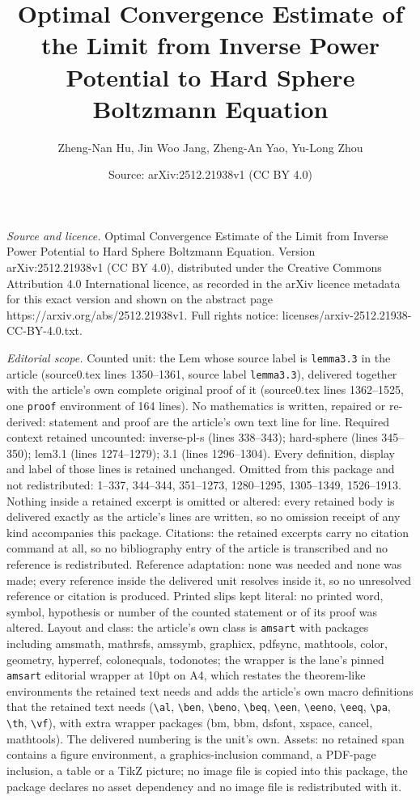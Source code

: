 \documentclass[10pt,a4paper]{amsart}
\title[Optimal Convergence Estimate of the Limit from Inverse Power]{Optimal Convergence Estimate of the Limit from Inverse Power Potential to Hard Sphere Boltzmann Equation}
\author{Zheng-Nan Hu, Jin Woo Jang, Zheng-An Yao, Yu-Long Zhou}
\date{Source: arXiv:2512.21938v1 (CC BY 4.0)}
\begin{document}
\maketitle

\noindent\emph{Source and licence.} Optimal Convergence Estimate of the Limit from Inverse Power Potential to Hard Sphere Boltzmann Equation. Version arXiv:2512.21938v1 (CC BY 4.0), distributed under the Creative Commons Attribution 4.0 International licence, as recorded in the arXiv licence metadata for this exact version and shown on the abstract page https://arxiv.org/abs/2512.21938v1. Full rights notice: licenses/arxiv-2512.21938-CC-BY-4.0.txt.\par\smallskip

\noindent\textit{Editorial scope.} Counted unit: the Lem whose source label is \texttt{lemma3.3} in the article (source0.tex lines 1350--1361, source label \texttt{lemma3.3}), delivered together with the article's own complete original proof of it (source0.tex lines 1362--1525, one \texttt{proof} environment of 164 lines). No mathematics is written, repaired or re-derived: statement and proof are the article's own text line for line. Required context retained uncounted: inverse-pl-s (lines 338--343); hard-sphere (lines 345--350); lem3.1 (lines 1274--1279); 3.1 (lines 1296--1304). Every definition, display and label of those lines is retained unchanged. Omitted from this package and not redistributed: 1--337, 344--344, 351--1273, 1280--1295, 1305--1349, 1526--1913. Nothing inside a retained excerpt is omitted or altered: every retained body is delivered exactly as the article's lines are written, so no omission receipt of any kind accompanies this package. Citations: the retained excerpts carry no citation command at all, so no bibliography entry of the article is transcribed and no reference is redistributed. Reference adaptation: none was needed and none was made; every reference inside the delivered unit resolves inside it, so no unresolved reference or citation is produced. Printed slips kept literal: no printed word, symbol, hypothesis or number of the counted statement or of its proof was altered. Layout and class: the article's own class is \texttt{amsart} with packages including amsmath, mathrsfs, amssymb, graphicx, pdfsync, mathtools, color, geometry, hyperref, colonequals, todonotes; the wrapper is the lane's pinned \texttt{amsart} editorial wrapper at 10pt on A4, which restates the theorem-like environments the retained text needs and adds the article's own macro definitions that the retained text needs (\texttt{\textbackslash al}, \texttt{\textbackslash ben}, \texttt{\textbackslash beno}, \texttt{\textbackslash beq}, \texttt{\textbackslash een}, \texttt{\textbackslash eeno}, \texttt{\textbackslash eeq}, \texttt{\textbackslash pa}, \texttt{\textbackslash th}, \texttt{\textbackslash vf}), with extra wrapper packages (bm, bbm, dsfont, xspace, cancel, mathtools). The delivered numbering is the unit's own. Assets: no retained span contains a figure environment, a graphics-inclusion command, a PDF-page inclusion, a table or a TikZ picture; no image file is copied into this package, the package declares no asset dependency and no image file is redistributed with it. 
\end{document}
